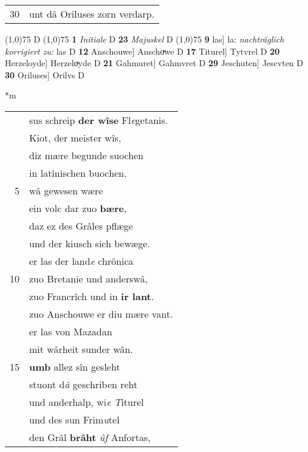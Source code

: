 \documentclass[8pt,a4paper,notitlepage]{article}
\begin{document}
\begin{table}[ht]
\begin{minipage}[t]{0.5\linewidth}
\begin{tabular}{rl}
30 & unt dâ Oriluses zorn verdarp.\\ 
\end{tabular}
\scriptsize
\line(1,0){75} \newline
D \newline
\line(1,0){75} \newline
\textbf{1} \textit{Initiale} D  \textbf{23} \textit{Majuskel} D  \newline
\line(1,0){75} \newline
\textbf{9} las] la: \textit{nachträglich korrigiert zu:} las D \textbf{12} Anschouwe] Anschoͮwe D \textbf{17} Titurel] Tytvrel D \textbf{20} Herzeloyde] Herzeloͮyde D \textbf{21} Gahmuret] Gahmvret D \textbf{29} Jeschuten] Jescvten D \textbf{30} Oriluses] Orilvs D \newline
\end{minipage}
\hspace{0.5cm}
\begin{minipage}[t]{0.5\linewidth}
\small
\begin{center}*m
\end{center}
\begin{tabular}{rl}
 & sus schreip \textbf{der wîse} Fl\textit{e}getanis.\\ 
 & Kiot, der meister wîs,\\ 
 & diz mære begunde suochen\\ 
 & in latînischen buochen,\\ 
5 & wâ gewesen wære\\ 
 & ein volc dar zuo \textbf{bære},\\ 
 & daz ez des Grâles pflæge\\ 
 & und der kiusch sich bewæge.\\ 
 & er las der land\textit{e} chrônica\\ 
10 & zuo Bretanie und anderswâ,\\ 
 & zuo Francrîch und in \textbf{ir lant}.\\ 
 & zuo Anschouwe er diu mære vant.\\ 
 & er las von Mazadan\\ 
 & mit wârheit sunder wân.\\ 
15 & \textbf{umb} allez sîn gesleht\\ 
 & stuont d\textit{â} geschriben reht\\ 
 & und anderhalp, wi\textit{e} \textit{T}iturel\\ 
 & und des sun Frim\textit{u}tel\\ 
 & den Grâl \textbf{brâht} \textit{ûf} Anfortas,\\ 

\end{tabular}
\end{minipage}
\end{table}
\end{document}
